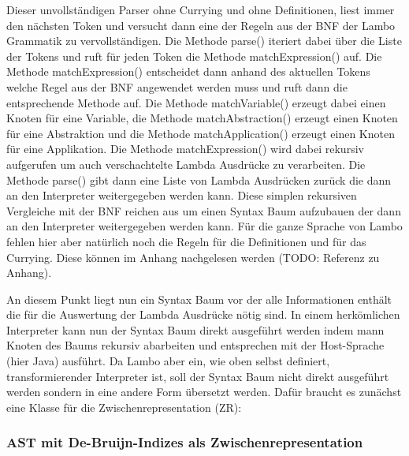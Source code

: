 \documentclass[ngerman]{article}
\begin{document}
Dieser unvollständigen Parser ohne Currying und ohne Definitionen, liest immer den nächsten Token und versucht dann eine der Regeln aus der BNF der Lambo Grammatik zu vervollständigen. Die Methode parse() iteriert dabei über die Liste der Tokens und ruft für jeden Token die Methode matchExpression() auf. Die Methode matchExpression() entscheidet dann anhand des aktuellen Tokens welche Regel aus der BNF angewendet werden muss und ruft dann die entsprechende Methode auf. Die Methode matchVariable() erzeugt dabei einen Knoten für eine Variable, die Methode matchAbstraction() erzeugt einen Knoten für eine Abstraktion und die Methode matchApplication() erzeugt einen Knoten für eine Applikation. Die Methode matchExpression() wird dabei rekursiv aufgerufen um auch verschachtelte Lambda Ausdrücke zu verarbeiten. Die Methode parse() gibt dann eine Liste von Lambda Ausdrücken zurück die dann an den Interpreter weitergegeben werden kann. Diese simplen rekursiven Vergleiche mit der BNF reichen aus um einen Syntax Baum aufzubauen der dann an den Interpreter weitergegeben werden kann. Für die ganze Sprache von Lambo fehlen hier aber natürlich noch die Regeln für die Definitionen und für das Currying. Diese können im Anhang nachgelesen werden (TODO: Referenz zu Anhang).

An diesem Punkt liegt nun ein Syntax Baum vor der alle Informationen enthält die für die Auswertung der Lambda Ausdrücke nötig sind. In einem herkömlichen Interpreter kann nun der Syntax Baum direkt ausgeführt werden indem mann Knoten des Baums rekursiv abarbeiten und entsprechen mit der Host-Sprache (hier Java) ausführt. Da Lambo aber ein, wie oben selbst definiert, transformierender Interpreter ist, soll der Syntax Baum nicht direkt ausgeführt werden sondern in eine andere Form übersetzt werden. Dafür braucht es zunächst eine Klasse für die Zwischenrepresentation (ZR):

\subsubsection{AST mit De-Bruijn-Indizes als Zwischenrepresentation}
\end{document}
